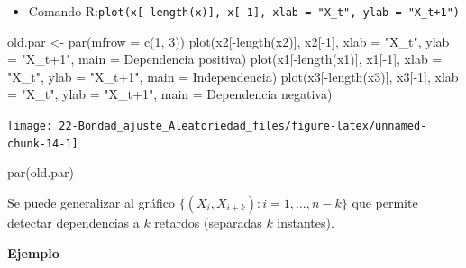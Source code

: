\documentclass[
]{book}
\newenvironment{Shaded}{\begin{snugshade}}{\end{snugshade}}
\newcommand{\AttributeTok}[1]{\textcolor[rgb]{0.77,0.63,0.00}{#1}}
\newcommand{\DecValTok}[1]{\textcolor[rgb]{0.00,0.00,0.81}{#1}}
\newcommand{\FunctionTok}[1]{\textcolor[rgb]{0.00,0.00,0.00}{#1}}
\newcommand{\NormalTok}[1]{#1}
\newcommand{\OtherTok}[1]{\textcolor[rgb]{0.56,0.35,0.01}{#1}}
\newcommand{\SpecialCharTok}[1]{\textcolor[rgb]{0.00,0.00,0.00}{#1}}
\newcommand{\StringTok}[1]{\textcolor[rgb]{0.31,0.60,0.02}{#1}}
\providecommand{\tightlist}{%
  \setlength{\itemsep}{0pt}\setlength{\parskip}{0pt}}
\theoremstyle{break}
\theoremstyle{definition}
\theoremstyle{definition}
\theoremstyle{definition}
\theoremstyle{definition}
\theoremstyle{remark}
\begin{document}
\begin{itemize}
\tightlist
\item
  Comando R:\texttt{plot(x{[}-length(x){]},\ x{[}-1{]},\ xlab\ =\ "X\_t",\ ylab\ =\ "X\_t+1")}
\end{itemize}

\begin{Shaded}
\begin{Highlighting}[]
\NormalTok{old.par }\OtherTok{\textless{}{-}} \FunctionTok{par}\NormalTok{(}\AttributeTok{mfrow =} \FunctionTok{c}\NormalTok{(}\DecValTok{1}\NormalTok{, }\DecValTok{3}\NormalTok{))}
\FunctionTok{plot}\NormalTok{(x2[}\SpecialCharTok{{-}}\FunctionTok{length}\NormalTok{(x2)], x2[}\SpecialCharTok{{-}}\DecValTok{1}\NormalTok{], }\AttributeTok{xlab =} \StringTok{"X\_t"}\NormalTok{, }\AttributeTok{ylab =} \StringTok{"X\_t+1"}\NormalTok{, }\AttributeTok{main =} \StringTok{\textquotesingle{}Dependencia positiva\textquotesingle{}}\NormalTok{)}
\FunctionTok{plot}\NormalTok{(x1[}\SpecialCharTok{{-}}\FunctionTok{length}\NormalTok{(x1)], x1[}\SpecialCharTok{{-}}\DecValTok{1}\NormalTok{], }\AttributeTok{xlab =} \StringTok{"X\_t"}\NormalTok{, }\AttributeTok{ylab =} \StringTok{"X\_t+1"}\NormalTok{, }\AttributeTok{main =} \StringTok{\textquotesingle{}Independencia\textquotesingle{}}\NormalTok{)}
\FunctionTok{plot}\NormalTok{(x3[}\SpecialCharTok{{-}}\FunctionTok{length}\NormalTok{(x3)], x3[}\SpecialCharTok{{-}}\DecValTok{1}\NormalTok{], }\AttributeTok{xlab =} \StringTok{"X\_t"}\NormalTok{, }\AttributeTok{ylab =} \StringTok{"X\_t+1"}\NormalTok{, }\AttributeTok{main =} \StringTok{\textquotesingle{}Dependencia negativa\textquotesingle{}}\NormalTok{)}
\end{Highlighting}
\end{Shaded}

\begin{center}\texttt{[image: 22-Bondad\_ajuste\_Aleatoriedad\_files/figure-latex/unnamed-chunk-14-1]} \end{center}

\begin{Shaded}
\begin{Highlighting}[]
\FunctionTok{par}\NormalTok{(old.par)}
\end{Highlighting}
\end{Shaded}

Se puede generalizar al gráfico \(\{(X_{i},X_{i+k}) : i = 1, \ldots, n-k \}\)
que permite detectar dependencias a \(k\) retardos
(separadas \(k\) instantes).

\textbf{Ejemplo}
\end{document}
